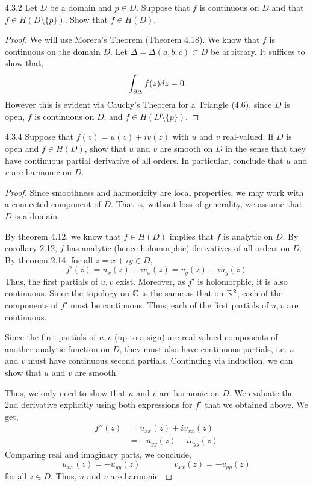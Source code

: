 \documentclass[12pt]{amsart}
\begin{document}
\begin{problem}{4.3.2}
    Let $D$ be a domain and $p \in D$. Suppose that $f$ is continuous on $D$ and that $f \in H(D\setminus \{p\})$. Show that $f \in H(D)$. 
\end{problem}
\begin{proof}
    We will use Morera's Theorem (Theorem 4.18). We know that $f$ is continuous on the domain $D$. Let $\Delta = \Delta(a,b,c) \subset D$ be arbitrary. It suffices to show that, 
    \[ \int_{\partial\Delta}f(z)dz = 0\]
    However this is evident via Cauchy's Theorem for a Triangle (4.6), since $D$ is open, $f$ is continuous on $D$, and $f \in H(D \setminus \{p\})$. 
\end{proof}
\newpage


\begin{problem}{4.3.4}
    Suppose that $f(z) = u(z) + iv(z)$ with $u$ and $v$ real-valued. If $D$ is open and $f \in H(D)$, show that $u$ and $v$ are smooth on $D$ in the sense that they have continuous partial derivative of all orders. In particular, conclude that $u$ and $v$ are harmonic on $D$. 
\end{problem}
\begin{proof}
    Since smoothness and harmonicity are local properties, we may work with a connected component of $D$. That is, without loss of generality, we assume that $D$ is a domain. 

    By theorem 4.12, we know that $f \in H(D)$ implies that $f$ is analytic on $D$. By corollary 2.12, $f$ has analytic (hence holomorphic) derivatives of all orders on $D$. By theorem 2.14, for all $z = x + iy \in D$, 
    \[ f'(z) = u_x(z) + iv_x(z) = v_y(z) - iu_y(z)\]
    Thus, the first partials of $u, v$ exist. Moreover, as $f'$ is holomorphic, it is also continuous. Since the topology on $\mathbb C$ is the same as that on $\mathbb R^2$, each of the components of $f'$ must be continuous. Thus, each of the first partials of $u, v$ are continuous. 

    Since the first partials of $u,v$ (up to a sign) are real-valued components of another analytic function on $D$, they must also have continuous partials, i.e. $u$ and $v$ must have continuous second partials. Continuing via induction, we can show that $u$ and $v$ are smooth. 

    Thus, we only need to show that $u$ and $v$ are harmonic on $D$. We evaluate the 2nd derivative explicitly using both expressions for $f'$ that we obtained above. We get, 
    \begin{align*}
        f''(z) &= u_{xx}(z) +iv_{xx}(z) \\
               &= -u_{yy}(z) -iv_{yy}(z)
    \end{align*}
    Comparing real and imaginary parts, we conclude,
    \[ u_{xx}(z) = -u_{yy}(z) \qquad \qquad v_{xx}(z) = -v_{yy}(z) \]
    for all $z \in D$. Thus, $u$ and $v$ are harmonic. 
\end{proof}
\newpage
\end{document}
